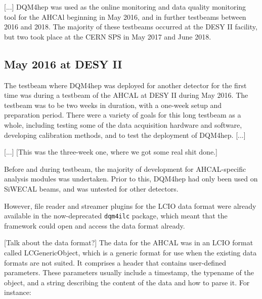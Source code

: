 [...] DQM4hep was used as the online monitoring and data quality monitoring tool for the AHCAl beginning in May 2016, and in further testbeams between 2016 and 2018. The majority of these testbeams occurred at the DESY II facility, but two took place at the CERN SPS in May 2017 and June 2018.

\subsection{May 2016 at DESY II}
The testbeam where DQM4hep was deployed for another detector for the first time was during a testbeam of the AHCAL at DESY II during May 2016. The testbeam was to be two weeks in duration, with a one-week setup and preparation period. There were a variety of goals for this long testbeam as a whole, including testing some of the data acquisition hardware and software, developing calibration methods, and to test the deployment of DQM4hep. [...]


[...] [This was the three-week one, where we got some real shit done.]

Before and during testbeam, the majority of development for AHCAL-specific analysis modules was undertaken. Prior to this, DQM4hep had only been used on SiWECAL beams, and was untested for other detectors. 

However, file reader and streamer plugins for the LCIO data format were already available in the now-deprecated \texttt{dqm4ilc} package, which meant that the framework could open and access the data format already.

[Talk about the data format?]
The data for the AHCAL was in an LCIO format called LCGenericObject, which is a generic format for use when the existing data formats are not suited. It comprises a header that contains user-defined parameters. These parameters usually include a timestamp, the typename of the object, and a string describing the content of the data and how to parse it. For instance:

